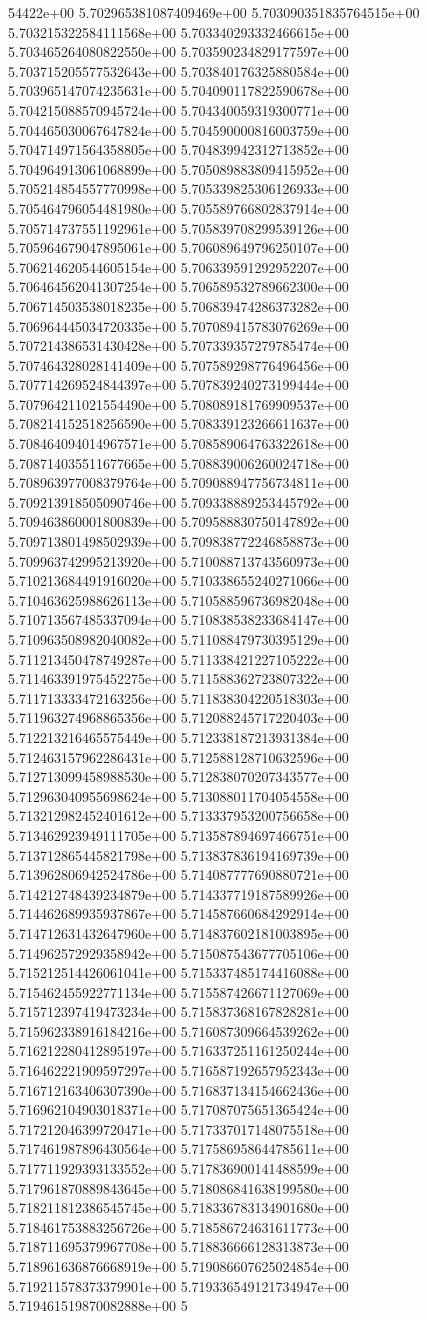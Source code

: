 54422e+00	5.702965381087409469e+00	5.703090351835764515e+00	5.703215322584111568e+00	5.703340293332466615e+00	5.703465264080822550e+00	5.703590234829177597e+00	5.703715205577532643e+00	5.703840176325880584e+00	5.703965147074235631e+00	5.704090117822590678e+00	5.704215088570945724e+00	5.704340059319300771e+00	5.704465030067647824e+00	5.704590000816003759e+00	5.704714971564358805e+00	5.704839942312713852e+00	5.704964913061068899e+00	5.705089883809415952e+00	5.705214854557770998e+00	5.705339825306126933e+00	5.705464796054481980e+00	5.705589766802837914e+00	5.705714737551192961e+00	5.705839708299539126e+00	5.705964679047895061e+00	5.706089649796250107e+00	5.706214620544605154e+00	5.706339591292952207e+00	5.706464562041307254e+00	5.706589532789662300e+00	5.706714503538018235e+00	5.706839474286373282e+00	5.706964445034720335e+00	5.707089415783076269e+00	5.707214386531430428e+00	5.707339357279785474e+00	5.707464328028141409e+00	5.707589298776496456e+00	5.707714269524844397e+00	5.707839240273199444e+00	5.707964211021554490e+00	5.708089181769909537e+00	5.708214152518256590e+00	5.708339123266611637e+00	5.708464094014967571e+00	5.708589064763322618e+00	5.708714035511677665e+00	5.708839006260024718e+00	5.708963977008379764e+00	5.709088947756734811e+00	5.709213918505090746e+00	5.709338889253445792e+00	5.709463860001800839e+00	5.709588830750147892e+00	5.709713801498502939e+00	5.709838772246858873e+00	5.709963742995213920e+00	5.710088713743560973e+00	5.710213684491916020e+00	5.710338655240271066e+00	5.710463625988626113e+00	5.710588596736982048e+00	5.710713567485337094e+00	5.710838538233684147e+00	5.710963508982040082e+00	5.711088479730395129e+00	5.711213450478749287e+00	5.711338421227105222e+00	5.711463391975452275e+00	5.711588362723807322e+00	5.711713333472163256e+00	5.711838304220518303e+00	5.711963274968865356e+00	5.712088245717220403e+00	5.712213216465575449e+00	5.712338187213931384e+00	5.712463157962286431e+00	5.712588128710632596e+00	5.712713099458988530e+00	5.712838070207343577e+00	5.712963040955698624e+00	5.713088011704054558e+00	5.713212982452401612e+00	5.713337953200756658e+00	5.713462923949111705e+00	5.713587894697466751e+00	5.713712865445821798e+00	5.713837836194169739e+00	5.713962806942524786e+00	5.714087777690880721e+00	5.714212748439234879e+00	5.714337719187589926e+00	5.714462689935937867e+00	5.714587660684292914e+00	5.714712631432647960e+00	5.714837602181003895e+00	5.714962572929358942e+00	5.715087543677705106e+00	5.715212514426061041e+00	5.715337485174416088e+00	5.715462455922771134e+00	5.715587426671127069e+00	5.715712397419473234e+00	5.715837368167828281e+00	5.715962338916184216e+00	5.716087309664539262e+00	5.716212280412895197e+00	5.716337251161250244e+00	5.716462221909597297e+00	5.716587192657952343e+00	5.716712163406307390e+00	5.716837134154662436e+00	5.716962104903018371e+00	5.717087075651365424e+00	5.717212046399720471e+00	5.717337017148075518e+00	5.717461987896430564e+00	5.717586958644785611e+00	5.717711929393133552e+00	5.717836900141488599e+00	5.717961870889843645e+00	5.718086841638199580e+00	5.718211812386545745e+00	5.718336783134901680e+00	5.718461753883256726e+00	5.718586724631611773e+00	5.718711695379967708e+00	5.718836666128313873e+00	5.718961636876668919e+00	5.719086607625024854e+00	5.719211578373379901e+00	5.719336549121734947e+00	5.719461519870082888e+00	5